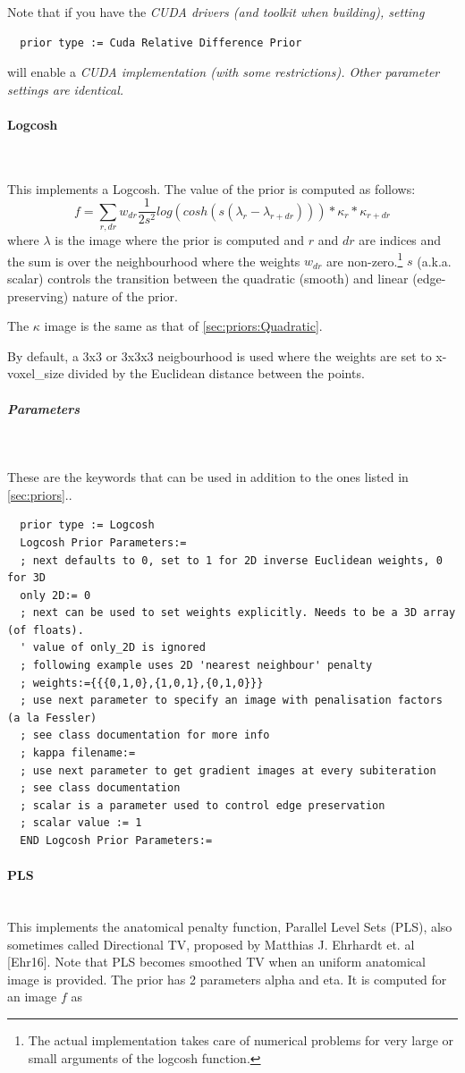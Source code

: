 \documentclass{article}
\newcommand{\subsubsubsection}[1]{\paragraph{#1}\mbox{} \\}
\newcommand{\subsubsubsubsection}[1]{\subparagraph{#1} \mbox{} \\}
\begin{document}
{{  Note that if you have the \em{CUDA} drivers (and toolkit when building), setting
  \begin{verbatim}
  prior type := Cuda Relative Difference Prior
  \end{verbatim}
  will enable a \em{CUDA} implementation (with some restrictions). Other parameter
  settings are identical.

{ \subsubsubsection{Logcosh} \label{sec:priors:Logcosh}
}
This implements a Logcosh. The value of the prior is computed as follows:
  \[
      f = \sum_{r,dr} w_{dr} \frac{1}{2 s^2}  log(cosh(s(\lambda_r - \lambda_{r+dr}))) * \kappa_r * \kappa_{r+dr}
  \]
  \noindent where $\lambda$ is the image where the prior is computed
   and $r$ and $dr$ are indices and the sum
  is over the neighbourhood where the weights $w_{dr}$ are non-zero.\footnote{The actual
  implementation takes care of numerical problems for very large or small
  arguments of the logcosh function.}
  $s$ (a.k.a. scalar) controls the transition between the quadratic (smooth) and linear (edge-preserving) nature of the prior.

  The $\kappa$ image is the same as that of \ref{sec:priors:Quadratic}.

  By default, a 3x3 or 3x3x3 neigbourhood is used where the weights are set to 
  x-voxel\_size divided by the Euclidean distance between the points.

{ \subsubsubsubsection{Parameters}
}
  These are the keywords that can be used in addition to the ones listed in \ref{sec:priors}..
  \begin{verbatim}
  prior type := Logcosh
  Logcosh Prior Parameters:=
  ; next defaults to 0, set to 1 for 2D inverse Euclidean weights, 0 for 3D 
  only 2D:= 0
  ; next can be used to set weights explicitly. Needs to be a 3D array (of floats).
  ' value of only_2D is ignored
  ; following example uses 2D 'nearest neighbour' penalty
  ; weights:={{{0,1,0},{1,0,1},{0,1,0}}}
  ; use next parameter to specify an image with penalisation factors (a la Fessler)
  ; see class documentation for more info
  ; kappa filename:=
  ; use next parameter to get gradient images at every subiteration
  ; see class documentation
  ; scalar is a parameter used to control edge preservation
  ; scalar value := 1
  END Logcosh Prior Parameters:=
  \end{verbatim}


{ \subsubsubsection{PLS}
This implements the  anatomical penalty function, Parallel Level Sets (PLS), also sometimes called Directional TV,
proposed by Matthias J. Ehrhardt et. al [Ehr16]. Note that
  PLS becomes smoothed TV when an uniform anatomical image is provided.  
The prior has 2 parameters alpha and eta. It is computed for an image $ f $ as

}}}
\end{document}
